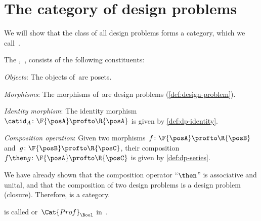 \section{The category of design problems}

We will show that the class of all design problems forms a category, which we call~\iindex{\DP}.

\begin{definition}
  \label{def:DP}
  The \emph{,~\DP}, consists of the following constituents:
  \begin{compactenum}
    \item \emph{Objects}: The objects of~\DP are posets.
    \item \emph{Morphisms}: The morphisms of~\DP are design problems (\cref{def:design-problem}).
    \item \emph{Identity morphism}: The identity morphism~$\catid_A \colon \F{\posA} \profto \R{\posA}$ is given by \cref{def:dp-identity}.
    \item \emph{Composition operation}: Given two morphisms~$f \colon  \F{\posA} \profto \R{\posB}$ and~$g \colon \F{\posB} \profto \R{\posC}$, their
    composition~$f\then g\colon \F{\posA} \profto \R{\posC}$ is given by \cref{def:dp-series}.
  \end{compactenum}
\end{definition}

We have already shown that the composition operator ``$\then$'' is associative and unital, and that the composition of two design problems is a design problem (closure). Therefore, \DP is a category.

\begin{remark}
  \DP is called \feas or~$\Cat{Prof}_\Bool$ in~\cite{fong2019}.
\end{remark}
